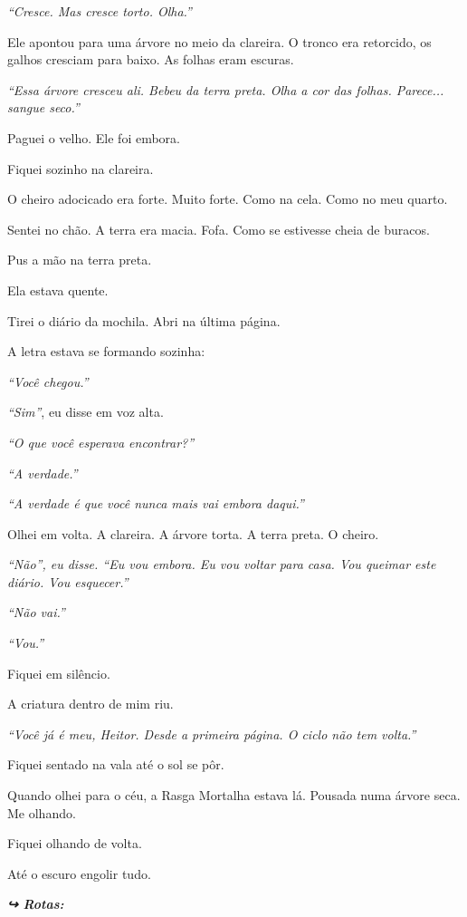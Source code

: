 \noindent \textit{\textquotedblleft{}Cresce. Mas cresce torto. Olha.\textquotedblright{}}

\noindent Ele apontou para uma árvore no meio da clareira. O tronco era retorcido, os galhos cresciam para baixo. As folhas eram escuras.

\noindent \textit{\textquotedblleft{}Essa árvore cresceu ali. Bebeu da terra preta. Olha a cor das folhas. Parece... sangue seco.\textquotedblright{}}

\noindent Paguei o velho. Ele foi embora.

\noindent Fiquei sozinho na clareira.

\noindent O cheiro adocicado era forte. Muito forte. Como na cela. Como no meu quarto.

\noindent Sentei no chão. A terra era macia. Fofa. Como se estivesse cheia de buracos.

\noindent Pus a mão na terra preta.

\noindent Ela estava quente.

\noindent Tirei o diário da mochila. Abri na última página.

\noindent A letra estava se formando sozinha:

\noindent \textit{\textquotedblleft{}Você chegou.\textquotedblright{}}

\noindent \textit{\textquotedblleft{}Sim\textquotedblright{}}, eu disse em voz alta.

\noindent \textit{\textquotedblleft{}O que você esperava encontrar?\textquotedblright{}}

\noindent \textit{\textquotedblleft{}A verdade.\textquotedblright{}}

\noindent \textit{\textquotedblleft{}A verdade é que você nunca mais vai embora daqui.\textquotedblright{}}

\noindent Olhei em volta. A clareira. A árvore torta. A terra preta. O cheiro.

\noindent \textit{\textquotedblleft{}Não\textquotedblright{}\textit{, eu disse. }\textquotedblleft{}Eu vou embora. Eu vou voltar para casa. Vou queimar este diário. Vou esquecer.\textquotedblright{}}

\noindent \textit{\textquotedblleft{}Não vai.\textquotedblright{}}

\noindent \textit{\textquotedblleft{}Vou.\textquotedblright{}}

\noindent Fiquei em silêncio.

\noindent A criatura dentro de mim riu.

\noindent \textit{\textquotedblleft{}Você já é meu, Heitor. Desde a primeira página. O ciclo não tem volta.\textquotedblright{}}

\noindent Fiquei sentado na vala até o sol se pôr.

\noindent Quando olhei para o céu, a Rasga Mortalha estava lá. Pousada numa árvore seca. Me olhando.

\noindent Fiquei olhando de volta.

\noindent Até o escuro engolir tudo.

\vspace{0.5em}
\noindent\textit{\textbf{↪ Rotas:}  \rotasep {}}